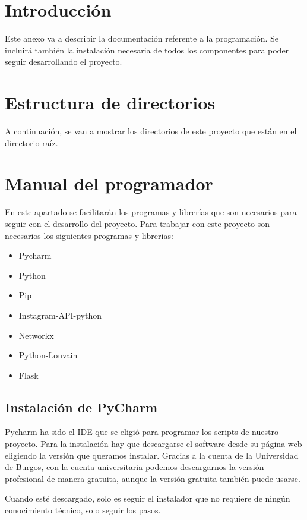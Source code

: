 
\section{Introducción}
Este anexo va a describir la documentación referente a la programación. Se incluirá también la instalación necesaria de todos los componentes para poder seguir desarrollando el proyecto.
\section{Estructura de directorios}
A continuación, se van a mostrar los directorios de este proyecto que están en el directorio raíz.



\section{Manual del programador}
En este apartado se facilitarán los programas y librerías que son necesarios para seguir con el desarrollo del proyecto.
Para trabajar con este proyecto son necesarios los siguientes programas y librerias:
\begin{itemize}
    \item Pycharm
    \item Python
    \item Pip
    \item Instagram-API-python
    \item Networkx
    \item Python-Louvain
    \item Flask
\end{itemize}


\subsection{Instalación de PyCharm}
Pycharm ha sido el IDE que se eligió para programar los scripts de nuestro proyecto. Para la instalación hay que descargarse el software desde su página web \cite{pycharm} eligiendo la versión que queramos instalar.
Gracias a la cuenta de la Universidad de Burgos, con la cuenta universitaria podemos descargarnos la versión profesional de manera gratuita, aunque la versión gratuita también puede usarse.

Cuando esté descargado, solo es seguir el instalador que no requiere de ningún conocimiento técnico, solo seguir los pasos.

